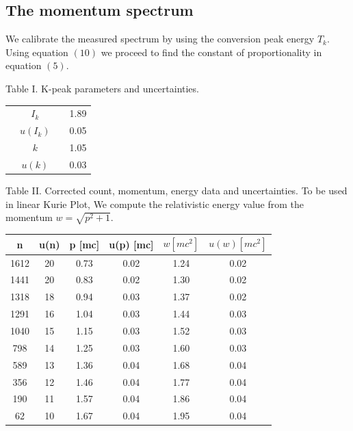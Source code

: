 \documentclass[9pt, a4paper]{article}
\begin{document}
\begin{multicols}{2}
\subsection{The momentum spectrum}
We calibrate the measured spectrum by using the conversion peak energy $T_k$. 
Using equation $(10)$ we proceed to find the constant of proportionality in equation $(5)$.

Table I. K-peak parameters and uncertainties.
\begin{center}
\begin{tabular}{ c c c c }
\hline
\hline
\phantom & $I_k$ & \phantom & 1.89 \\ 
\phantom & $u(I_k)$ & \phantom & 0.05  \\
\phantom & $k$ & \phantom & 1.05  \\
\phantom & $u(k)$ & \phantom & 0.03 \\
\hline
\hline
\end{tabular}
\end{center}

Table II. Corrected count, momentum, energy data and uncertainties.
To be used in linear Kurie Plot, We compute the relativistic energy value from the momentum $w = \sqrt{p^2 + 1}$.
\begin{tabular}{ c c c c c c }
\hline
\hline
n & u(n) & p [mc] & u(p) [mc] & $w [mc^2]$ & $u(w) [mc^2]$ \\
\hline
1612 &  20 & 0.73 & 0.02 & 1.24 & 0.02 \\
1441 &  20 & 0.83 & 0.02 & 1.30 & 0.02 \\
1318 &  18 & 0.94 & 0.03 & 1.37 & 0.02 \\
1291 &  16 & 1.04 & 0.03 & 1.44 & 0.03 \\
1040 &  15 & 1.15 & 0.03 & 1.52 & 0.03 \\
798 &  14 & 1.25 & 0.03 & 1.60 & 0.03 \\
589 &  13 & 1.36 & 0.04 & 1.68 & 0.04 \\
356 &  12 & 1.46 & 0.04 & 1.77 & 0.04 \\
190 &  11 & 1.57 & 0.04 & 1.86 & 0.04 \\
62 &  10 & 1.67 & 0.04 & 1.95 & 0.04 \\
\hline
\hline
\end{tabular}


\end{multicols}
\end{document}
